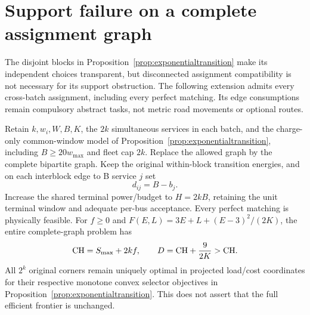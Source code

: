 \section{Support failure on a complete assignment graph}
\label{app:completegraphtransition}
The disjoint blocks in Proposition~\ref{prop:exponentialtransition}
make its independent choices transparent, but disconnected assignment
compatibility is not necessary for its support obstruction. The following
extension admits every cross-batch assignment, including every perfect
matching. Its edge consumptions remain compulsory abstract tasks, not
metric road movements or optional routes.

\begin{proposition}
\label{prop:completegraphtransition}
Retain $k,w_i,W,B,K$, the $2k$ simultaneous services in each batch, and
the charge-only common-window model of
Proposition~\ref{prop:exponentialtransition}, including $B\ge20w_{\max}$
and fleet cap $2k$. Replace the allowed graph by the complete bipartite
graph. Keep the original within-block transition energies, and on each
interblock edge to B service $j$ set
\[
 d_{ij}=B-b_j.
\]
Increase the shared terminal power/budget to $H=2kB$, retaining the unit
terminal window and adequate per-bus acceptance. Every perfect matching
is physically feasible. For $f\ge0$ and
$F(E,L)=3E+L+(E-3)^2/(2K)$, the entire complete-graph problem has
\[
 \mathrm{CH}=S_{\max}+2kf,\qquad
 D=\mathrm{CH}+\frac{9}{2K}>\mathrm{CH}.
\]
All $2^k$ original corners remain uniquely optimal in projected load/cost
coordinates for their respective monotone convex selector objectives in
Proposition~\ref{prop:exponentialtransition}. This does not assert that
the full efficient frontier is unchanged.
\end{proposition}


